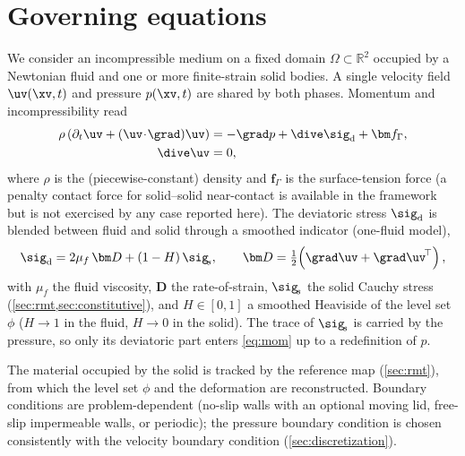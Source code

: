 \section{Governing equations}
\label{sec:governing}

We consider an incompressible medium on a fixed domain $\Omega\subset\mathbb{R}^2$
occupied by a Newtonian fluid and one or more finite-strain solid bodies. A single
velocity field $\uv(\xv,t)$ and pressure $p(\xv,t)$ are shared by both phases. Momentum
and incompressibility read
\begin{align}
\rho\left(\partial_t\uv + (\uv\!\cdot\!\grad)\uv\right)
   &= -\grad p + \dive\sig_{\mathrm{d}} + \bm f_{\Gamma},
   \label{eq:mom}\\
\dive\uv &= 0,
   \label{eq:incomp}
\end{align}
where $\rho$ is the (piecewise-constant) density and $\bm f_\Gamma$ is the surface-tension
force (a penalty contact force for solid--solid near-contact is available in the framework
but is not exercised by any case reported here). The deviatoric stress $\sig_{\mathrm d}$ is
blended between fluid and solid through a smoothed indicator (one-fluid model),
\begin{equation}
\sig_{\mathrm d} = 2\mu_f\,\bm D
   + (1-H)\,\sig_{\!s},
   \qquad
\bm D=\tfrac12\!\left(\grad\uv+\grad\uv^{\!\top}\right),
   \label{eq:blend}
\end{equation}
with $\mu_f$ the fluid viscosity, $\bm D$ the rate-of-strain, $\sig_{\!s}$ the solid
Cauchy stress (\cref{sec:rmt,sec:constitutive}), and $H\in[0,1]$ a smoothed Heaviside
of the level set $\phi$ ($H\to1$ in the fluid, $H\to0$ in the solid). The trace of
$\sig_{\!s}$ is carried by the pressure, so only its deviatoric part enters
\cref{eq:mom} up to a redefinition of $p$.

The material occupied by the solid is tracked by the reference map (\cref{sec:rmt}),
from which the level set $\phi$ and the deformation are reconstructed. Boundary
conditions are problem-dependent (no-slip walls with an optional moving lid, free-slip
impermeable walls, or periodic); the pressure boundary condition is chosen consistently
with the velocity boundary condition (\cref{sec:discretization}).
